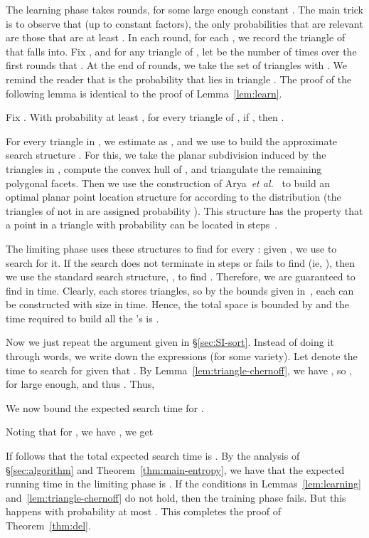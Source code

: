 \documentclass{siamltex}
\newcommand{\etal}{\emph{et al.}}
\begin{document}
The learning phase takes  rounds, for some
large enough constant . 
The main trick is to observe that 
(up to constant factors), the only probabilities that are relevant
are those that are at least . In each round, for each ,
we record the triangle of  that  falls into. Fix , and for any
triangle  of , let  be the number of times over
the first  rounds that . 
At the
end of  rounds, we take the set  of triangles 
with . 
We remind the reader that  is the probability that  lies
in triangle . The proof of the following lemma is identical to
the proof of Lemma~\ref{lem:learn}.
\begin{lemma}\label{lem:triangle-chernoff}
Fix . With probability at least , for every triangle
 of , if , then
. \qquad \endproof
\end{lemma}

For every triangle   in , we estimate  as 
,  and we use  to
build the approximate search structure . 
For this, we take the planar subdivision  induced by the
triangles in , compute the convex hull of ,
and triangulate the remaining polygonal facets.
Then we use the construction of Arya~\etal~\cite{AMM} 
to build an optimal planar point location structure  for 
according to the distribution  (the triangles of  not
in  are assigned probability ). This structure 
has the property that a point in a triangle  with probability 
can be located in  
steps~\cite[Theorems~1.1 and 1.2]{AMM}. 

The limiting phase
uses these structures to find  for every : given
, we use  to search for it. 
If the search does
not terminate in  steps or  fails to find
 (ie,  ), then we use the
standard search structure, , to find . Therefore,
we are guaranteed to find  in  time.
Clearly, each  stores  triangles,
so by the bounds given in~\cite{AMM}, each  can be constructed 
with size  in  time.
Hence, the total space is bounded by  and the
time required to build all the 's is .

Now we just repeat the argument
given in \S\ref{sec:SI-sort}. 
Instead of doing it through words, we 
write down the expressions (for some variety).
Let  denote
the time to search for  given that .
By Lemma~\ref{lem:triangle-chernoff}, we have ,
so , for  large enough, and thus
.
Thus,

We now bound the expected search time for .

Noting that for , we have 
, we get 

If follows that the total expected search time is 
. By the
analysis of \S\ref{sec:algorithm} and Theorem~\ref{thm:main-entropy},
we have that the expected running time in the limiting phase is 
.
If the conditions in Lemmas~\ref{lem:learning} 
and~\ref{lem:triangle-chernoff} do not hold, then
the training phase fails. But this happens with probability
at most .
This completes the proof of Theorem~\ref{thm:del}.
\end{document}
